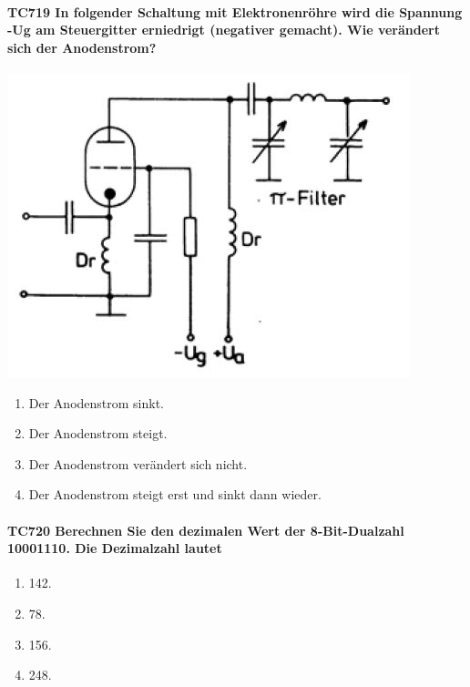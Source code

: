 \documentclass[8pt]{article}
\begin{document}
\begin{enumerate}
\begin{enumerate}[nolistsep,label=\Alph*]
{\begin{enumerate}[nolistsep,label=\Alph*]
\paragraph*{TC719 In folgender Schaltung mit Elektronenröhre wird die Spannung -Ug am Steuergitter erniedrigt (negativer gemacht). Wie verändert sich der Anodenstrom?}
\begin{center}
	\begin{minipage}{\linewidth}
		\centering
		\includegraphics[scale=1.0]{pics/tc719_a.jpg}
	\end{minipage}
\end{center}
\begin{enumerate}[nolistsep,label=\Alph*]
\item Der Anodenstrom sinkt.
\item Der Anodenstrom steigt.
\item Der Anodenstrom verändert sich nicht.
\item Der Anodenstrom steigt erst und sinkt dann wieder.
\end{enumerate}

\paragraph*{TC720 Berechnen Sie den dezimalen Wert der 8-Bit-Dualzahl 10001110. Die Dezimalzahl lautet}
\begin{enumerate}[nolistsep,label=\Alph*]
\item 142.
\item 78.
\item 156.
\item 248.
\end{enumerate}


\end{enumerate}}
\end{enumerate}
\end{enumerate}
\end{document}
